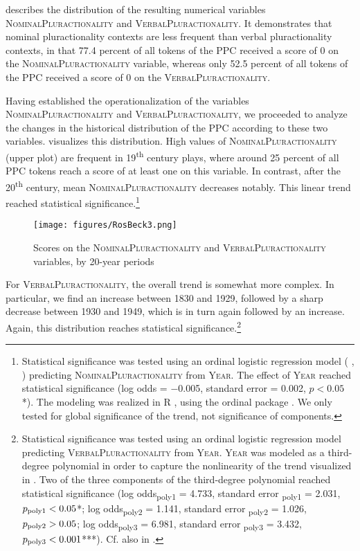\documentclass[output=paper,colorlinks,citecolor=brown]{langscibook}
\begin{document}
 describes the distribution of the resulting numerical variables \textsc{NominalPluractionality} and \textsc{VerbalPluractionality}. It demonstrates that nominal pluractionality contexts are less frequent than verbal pluractionality contexts, in that 77.4 percent of all tokens of the PPC received a score of 0 on the \textsc{NominalPluractionality} variable, whereas only 52.5 percent of all tokens of the PPC received a score of 0 on the \textsc{VerbalPluractionality}. 



Having established the operationalization of the variables \textsc{NominalPluractionality} and \textsc{VerbalPluractionality}, we proceeded to analyze the changes in the historical distribution of the PPC according to these two variables.  visualizes this distribution. High values of \textsc{NominalPluractionality} (upper plot) are frequent in 19\textsuperscript{th} century plays, where around 25 percent of all PPC tokens reach a score of at least one on this variable. In contrast, after the 20\textsuperscript{th} century, mean \textsc{NominalPluractionality} decreases notably. This linear trend reached statistical significance.\footnote{\label{fn:rb7}Statistical significance was tested using an ordinal logistic regression model (\citeauthor{JohnsonAlbert2004} \citeyear{JohnsonAlbert2004}, \citeauthor{Agresti2010} \citeyear{Agresti2010}) predicting \textsc{NominalPluractionality} from \textsc{Year}. The effect of \textsc{Year} reached statistical significance (log odds = $-$0.005, standard error = 0.002, $p<0.05$*). The modeling was realized in R \parencite{RDevelopmentCoreTeam2019}, using the ordinal package \parencite{Christensen2019}. We only tested for global significance of the trend, not significance of components.}

\begin{figure}
\texttt{[image: figures/RosBeck3.png]}
\caption{Scores on the \textsc{NominalPluractionality} and \textsc{VerbalPluractionality} variables, by 20-year periods}
\label{fig:rb3}
\end{figure}

For \textsc{VerbalPluractionality}, the overall trend is somewhat more complex. In particular, we find an increase between 1830 and 1929, followed by a sharp decrease between 1930 and 1949, which is in turn again followed by an increase. Again, this distribution reaches statistical significance.\footnote{Statistical significance was tested using an ordinal logistic regression model predicting \textsc{VerbalPluractionality} from \textsc{Year}. \textsc{Year} was modeled as a third-degree polynomial in order to capture the nonlinearity of the trend visualized in . Two of the three components of the third-degree polynomial reached statistical significance (log odds\textsubscript{poly1} = 4.733, standard error \textsubscript{poly1} = 2.031, $p \textsubscript{poly1}<0.05$*; log odds\textsubscript{poly2} = 1.141, standard error \textsubscript{poly2} = 1.026, $p \textsubscript{poly2}>0.05$; log odds\textsubscript{poly3} = 6.981, standard error \textsubscript{poly3} = 3.432, $p \textsubscript{poly3}<0.001$***). Cf. also  in .}
\end{document}
